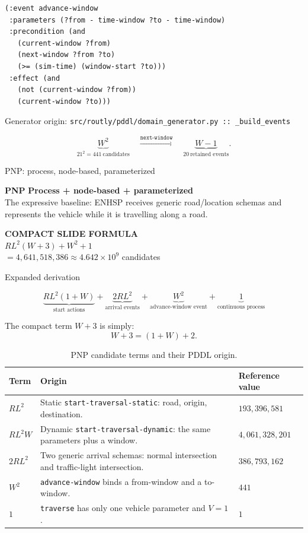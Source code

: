 \documentclass[11pt,a4paper]{article}
\makeatletter
\renewcommand{\section}{\@startsection{section}{1}{0pt}
  {-2.2ex plus -0.5ex minus -0.2ex}
  {1.0ex plus 0.2ex}
  {\normalfont\Large\bfseries\color{RoutlyNavy}}}
\renewcommand{\subsection}{\@startsection{subsection}{2}{0pt}
  {-1.8ex plus -0.4ex minus -0.2ex}
  {0.75ex plus 0.2ex}
  {\normalfont\large\bfseries\color{RoutlyNavy}}}
\newcommand{\configbanner}[4]{%
  \begin{tcolorbox}[
    enhanced,
    colback=#1!8,
    colframe=#1,
    boxrule=0.9pt,
    arc=2mm,
    left=3mm,right=3mm,top=2.5mm,bottom=2.5mm]
    {\LARGE\bfseries\textcolor{#1}{#2}}\hfill
    {\large\bfseries\textcolor{RoutlyNavy}{#3}}\\[1mm]
    {\small\textcolor{RoutlyInk}{#4}}
  \end{tcolorbox}
}
\newcommand{\formularesult}[3]{%
  \begin{tcolorbox}[
    enhanced,
    colback=#1!5,
    colframe=#1!80,
    boxrule=0.8pt,
    arc=2mm,
    left=2.5mm,right=2.5mm,top=2mm,bottom=2mm]
    \centering
    {\small\bfseries\textcolor{RoutlyMuted}{COMPACT SLIDE FORMULA}}\\[1mm]
    {\Large\bfseries\boldmath \(#2\)}\\[1mm]
    {\normalsize #3}
  \end{tcolorbox}
}
\newcommand{\codeorigin}[1]{%
  {\footnotesize\textcolor{RoutlyMuted}{Generator origin: \texttt{#1}}\par}
}
\makeatother
\begin{document}
\begin{lstlisting}
(:event advance-window
 :parameters (?from - time-window ?to - time-window)
 :precondition (and
   (current-window ?from)
   (next-window ?from ?to)
   (>= (sim-time) (window-start ?to)))
 :effect (and
   (not (current-window ?from))
   (current-window ?to)))
\end{lstlisting}
\codeorigin{src/routly/pddl/domain\_generator.py :: \_build\_events}

\[
\underbrace{W^2}_{21^2=441\ \text{candidates}}
\quad\xrightarrow{\texttt{next-window}}\quad
\underbrace{W-1}_{20\ \text{retained events}}.
\]

\section{PNP: process, node-based, parameterized}

\configbanner{PNPColor}{PNP}{Process + node-based + parameterized}{
The expressive baseline: ENHSP receives generic road/location schemas and
represents the vehicle while it is travelling along a road.}

\formularesult{PNPColor}
  {R L^2(W+3)+W^2+1}
  {\(=4{,}641{,}518{,}386\approx4.642\times10^9\) candidates}

\subsection{Expanded derivation}

\[
\boxed{
\underbrace{R L^2(1+W)}_{\text{start actions}}
+
\underbrace{2R L^2}_{\text{arrival events}}
+
\underbrace{W^2}_{\text{advance-window event}}
+
\underbrace{1}_{\text{continuous process}}
}
\]

The compact term \(W+3\) is simply:
\[
W+3=(1+W)+2.
\]

\begin{table}[h]
\centering
\caption{PNP candidate terms and their PDDL origin.}
\begin{tabularx}{\textwidth}{@{}C{3.0cm}Y C{3.0cm}@{}}
\toprule
\textbf{Term} & \textbf{Origin} & \textbf{Reference value}\\
\midrule
\(R L^2\) &
Static \texttt{start-traversal-static}: road, origin, destination. &
\(193{,}396{,}581\)\\
\addlinespace[2pt]
\(R L^2W\) &
Dynamic \texttt{start-traversal-dynamic}: the same parameters plus a window. &
\(4{,}061{,}328{,}201\)\\
\addlinespace[2pt]
\(2R L^2\) &
Two generic arrival schemas: normal intersection and traffic-light intersection. &
\(386{,}793{,}162\)\\
\addlinespace[2pt]
\(W^2\) &
\texttt{advance-window} binds a from-window and a to-window. &
\(441\)\\
\addlinespace[2pt]
\(1\) &
\texttt{traverse} has only one vehicle parameter and \(V=1\). &
\(1\)\\
\bottomrule
\end{tabularx}
\end{table}
\end{document}
